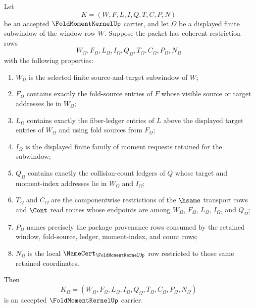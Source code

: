 \begin{theorem}
\label{thm:fold-moment-kernel-finite-window-restriction-carrier}
Let
$$
K=(W,F,L,I,Q,T,C,P,N)
$$
be an accepted $\FoldMomentKernelUp$ carrier, and let $\Omega$ be a displayed
finite subwindow of the window row $W$. Suppose the packet has coherent
restriction rows
$$
W_{\Omega},F_{\Omega},L_{\Omega},I_{\Omega},Q_{\Omega},T_{\Omega},C_{\Omega},P_{\Omega},N_{\Omega}
$$
with the following properties:
\begin{enumerate}
\item $W_{\Omega}$ is the selected finite source-and-target subwindow of $W$;
\item $F_{\Omega}$ contains exactly the fold-source entries of $F$ whose
visible source or target addresses lie in $W_{\Omega}$;
\item $L_{\Omega}$ contains exactly the fiber-ledger entries of $L$ above the
displayed target entries of $W_{\Omega}$ and using fold sources from
$F_{\Omega}$;
\item $I_{\Omega}$ is the displayed finite family of moment requests retained
for the subwindow;
\item $Q_{\Omega}$ contains exactly the collision-count ledgers of $Q$ whose
target and moment-index addresses lie in $W_{\Omega}$ and $I_{\Omega}$;
\item $T_{\Omega}$ and $C_{\Omega}$ are the componentwise restrictions of the
$\hsame$ transport rows and $\Cont$ read routes whose endpoints are among
$W_{\Omega}$, $F_{\Omega}$, $L_{\Omega}$, $I_{\Omega}$, and $Q_{\Omega}$;
\item $P_{\Omega}$ names precisely the package provenance rows consumed by the
retained window, fold-source, ledger, moment-index, and count rows;
\item $N_{\Omega}$ is the local $\NameCert_{\FoldMomentKernelUp}$ row restricted
to those same retained coordinates.
\end{enumerate}
Then
$$
K_{\Omega}=(W_{\Omega},F_{\Omega},L_{\Omega},I_{\Omega},Q_{\Omega},T_{\Omega},C_{\Omega},P_{\Omega},N_{\Omega})
$$
is an accepted $\FoldMomentKernelUp$ carrier.
\end{theorem}
